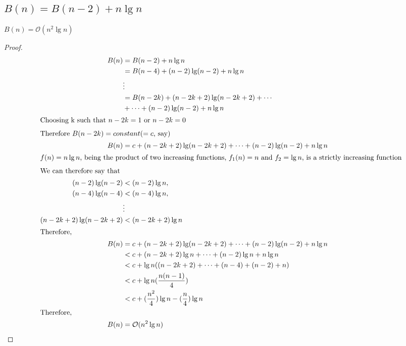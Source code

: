 \documentclass{article}
\begin{document}
\subsection{$B(n) = B(n-2) + n\lg n$}
$B(n) = \mathcal{O}(n^2\lg n)$
\begin{proof}

\begin{align*}
B(n) & = B(n-2) + n\lg n \\
& = B(n-4) + (n-2)\lg(n-2) + n\lg n \\
& \vdots \\
& = B(n-2k) + (n-2k+2)\lg(n-2k+2)+ \cdots \\
& + \cdots + (n-2)\lg(n-2) + n\lg n \\
\intertext{Choosing k such that $n - 2k = 1$ or $ n - 2k = 0$}
\intertext{Therefore $B(n-2k) = constant$($= c$, say)}
B(n) & = c + (n-2k+2)\lg(n-2k+2)+ \cdots + (n-2)\lg(n-2) + n\lg n \\
\intertext{$f(n) = n\lg n$, being the product of two increasing functions, $f_1(n) = n$ and $f_2 = \lg n$, is a strictly increasing function}
\intertext {We can therefore say that }
(n-2)\lg(n-2) & < (n-2)\lg n, \\
(n-4)\lg(n-4) & < (n-4)\lg n, \\
&\vdots \\
(n-2k+2)\lg(n-2k+2) & < (n-2k+2)\lg n \\
\intertext{Therefore, }
B(n) & = c + (n-2k+2)\lg(n-2k+2)+ \cdots + (n-2)\lg(n-2) + n\lg n \\
& < c + (n-2k+2)\lg n+ \cdots + (n-2)\lg n + n\lg n \\
& < c + \lg n((n-2k+2) + \dots + (n-4) + (n-2) + n) \\
& < c + \lg n(\frac{n(n-1)}{4}) \\
& < c + (\frac{n^2}{4})\lg n - (\frac{n}{4})\lg n \\
\intertext{Therefore, }
B(n) & = \mathcal{O}(n^2\lg n)
\end{align*}

\end{proof}

\newpage
\end{document}
